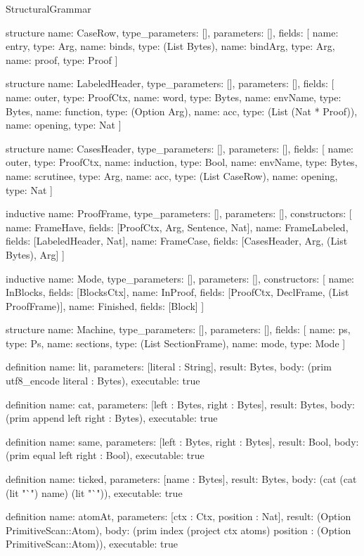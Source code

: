 \begin{lexlean}{StructuralGrammar}
\begin{semanticmodule}
structure{
  name: CaseRow,
  type_parameters: [],
  parameters: [],
  fields: [
    {name: entry, type: Arg},
    {name: binds, type: (List Bytes)},
    {name: bindArg, type: Arg},
    {name: proof, type: Proof}
  ]
}

structure{
  name: LabeledHeader,
  type_parameters: [],
  parameters: [],
  fields: [
    {name: outer, type: ProofCtx},
    {name: word, type: Bytes},
    {name: envName, type: Bytes},
    {name: function, type: (Option Arg)},
    {name: acc, type: (List (Nat * Proof))},
    {name: opening, type: Nat}
  ]
}

structure{
  name: CasesHeader,
  type_parameters: [],
  parameters: [],
  fields: [
    {name: outer, type: ProofCtx},
    {name: induction, type: Bool},
    {name: envName, type: Bytes},
    {name: scrutinee, type: Arg},
    {name: acc, type: (List CaseRow)},
    {name: opening, type: Nat}
  ]
}

inductive{
  name: ProofFrame,
  type_parameters: [],
  parameters: [],
  constructors: [
    {name: FrameHave, fields: [ProofCtx, Arg, Sentence, Nat]},
    {name: FrameLabeled, fields: [LabeledHeader, Nat]},
    {name: FrameCase, fields: [CasesHeader, Arg, (List Bytes), Arg]}
  ]
}

inductive{
  name: Mode,
  type_parameters: [],
  parameters: [],
  constructors: [
    {name: InBlocks, fields: [BlocksCtx]},
    {name: InProof, fields: [ProofCtx, DeclFrame, (List ProofFrame)]},
    {name: Finished, fields: [Block]}
  ]
}

structure{
  name: Machine,
  type_parameters: [],
  parameters: [],
  fields: [
    {name: ps, type: Ps},
    {name: sections, type: (List SectionFrame)},
    {name: mode, type: Mode}
  ]
}

definition{
  name: lit,
  parameters: [literal : String],
  result: Bytes,
  body: (prim utf8_encode literal : Bytes),
  executable: true
}

definition{
  name: cat,
  parameters: [left : Bytes, right : Bytes],
  result: Bytes,
  body: (prim append left right : Bytes),
  executable: true
}

definition{
  name: same,
  parameters: [left : Bytes, right : Bytes],
  result: Bool,
  body: (prim equal left right : Bool),
  executable: true
}

definition{
  name: ticked,
  parameters: [name : Bytes],
  result: Bytes,
  body: (cat (cat (lit "`") name) (lit "`")),
  executable: true
}

definition{
  name: atomAt,
  parameters: [ctx : Ctx, position : Nat],
  result: (Option PrimitiveScan::Atom),
  body: (prim index (project ctx atoms) position : (Option PrimitiveScan::Atom)),
  executable: true
}


\end{semanticmodule}
\end{lexlean}
